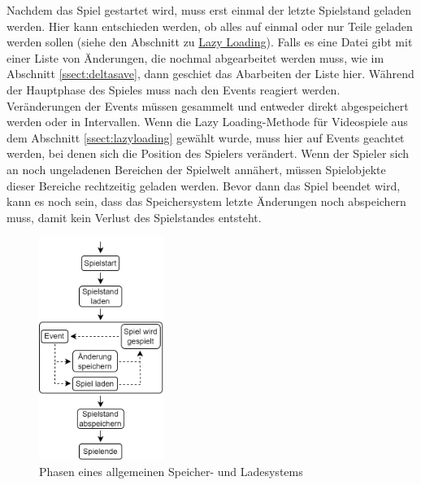 Nachdem das Spiel gestartet wird, muss erst einmal der letzte Spielstand geladen werden. Hier kann entschieden werden, ob alles auf einmal oder nur Teile geladen werden sollen (siehe den Abschnitt zu \hyperref[ssect:lazyloading]{Lazy Loading}). Falls es eine Datei gibt mit einer Liste von Änderungen, die nochmal abgearbeitet werden muss, wie im Abschnitt \ref{ssect:deltasave}, dann geschiet das Abarbeiten der Liste hier. Während der Hauptphase des Spieles muss nach den Events reagiert werden. Veränderungen der Events müssen gesammelt und entweder direkt abgespeichert werden oder in Intervallen. Wenn die Lazy Loading-Methode für Videospiele aus dem Abschnitt \ref{ssect:lazyloading} gewählt wurde, muss hier auf Events geachtet werden, bei denen sich die Position des Spielers verändert. Wenn der Spieler sich an noch ungeladenen Bereichen der Spielwelt annähert, müssen Spielobjekte dieser Bereiche rechtzeitig geladen werden. Bevor dann das Spiel beendet wird, kann es noch sein, dass das Speichersystem letzte Änderungen noch abspeichern muss, damit kein Verlust des Spielstandes entsteht.

\begin{figure}[htp]
    \centering
    \includegraphics[width=0.36\textwidth]{images/Speichersystem.png}
    \caption{Phasen eines allgemeinen Speicher- und Ladesystems}
    \label{fig:speicherphasen}
\end{figure}

